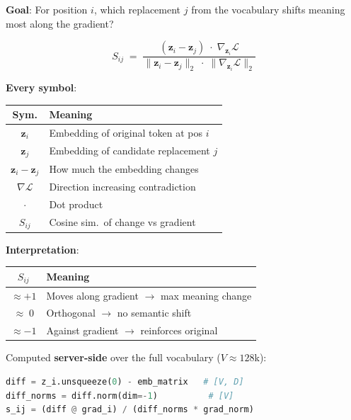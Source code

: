 \documentclass[10pt,a4paper,twocolumn]{article}
\begin{document}
\textbf{Goal}: For position $i$, which replacement $j$ from the vocabulary shifts meaning most along the gradient?

\begin{mathbox}[title=Substitution Score]
\[
S_{ij} \;=\; \frac{(\bm{z}_i - \bm{z}_j) \;\cdot\; \nabla_{\!\bm{z}_i}\mathcal{L}}{\lVert \bm{z}_i - \bm{z}_j \rVert_2 \;\cdot\; \lVert \nabla_{\!\bm{z}_i}\mathcal{L} \rVert_2}
\]
\end{mathbox}

\textbf{Every symbol}:

\begin{scriptsize}
\begin{tabular}{@{}cp{}@{}}
\toprule
\textbf{Sym.} & \textbf{Meaning} \\
\midrule
$\bm{z}_i$ & Embedding of original token at pos $i$ \\
$\bm{z}_j$ & Embedding of candidate replacement $j$ \\
$\bm{z}_i{-}\bm{z}_j$ & How much the embedding changes \\
$\nabla\mathcal{L}$ & Direction increasing contradiction \\
$\cdot$ & Dot product \\
$S_{ij}$ & Cosine sim.\ of change vs gradient \\
\bottomrule
\end{tabular}
\end{scriptsize}

\textbf{Interpretation}:

\begin{scriptsize}
\begin{tabular}{@{}cp{}@{}}
\toprule
$S_{ij}$ & \textbf{Meaning} \\
\midrule
${\approx}{+}1$ & Moves along gradient $\to$ max meaning change \\
${\approx}\;0$ & Orthogonal $\to$ no semantic shift \\
${\approx}{-}1$ & Against gradient $\to$ reinforces original \\
\bottomrule
\end{tabular}
\end{scriptsize}

Computed \textbf{server-side} over the full vocabulary ($V \approx 128$k):

\begin{lstlisting}[language=Python]
diff = z_i.unsqueeze(0) - emb_matrix   # [V, D]
diff_norms = diff.norm(dim=-1)          # [V]
s_ij = (diff @ grad_i) / (diff_norms * grad_norm)
\end{lstlisting}
\end{document}
